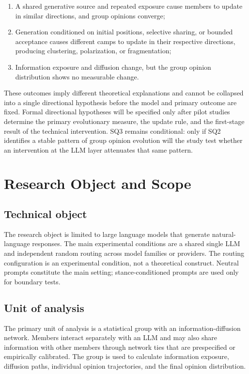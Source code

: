 \documentclass[11pt,a4paper]{article}
\begin{document}
\begin{enumerate}
\item A shared generative source and repeated exposure cause members to update in similar directions, and group opinions converge;
\item Generation conditioned on initial positions, selective sharing, or bounded acceptance causes different camps to update in their respective directions, producing clustering, polarization, or fragmentation;
\item Information exposure and diffusion change, but the group opinion distribution shows no measurable change.
\end{enumerate}

These outcomes imply different theoretical explanations and cannot be collapsed into a single directional hypothesis before the model and primary outcome are fixed. Formal directional hypotheses will be specified only after pilot studies determine the primary evolutionary measure, the update rule, and the first-stage result of the technical intervention. SQ3 remains conditional: only if SQ2 identifies a stable pattern of group opinion evolution will the study test whether an intervention at the LLM layer attenuates that same pattern.

\section{Research Object and Scope}

\subsection{Technical object}

The research object is limited to large language models that generate natural-language responses. The main experimental conditions are a shared single LLM and independent random routing across model families or providers. The routing configuration is an experimental condition, not a theoretical construct. Neutral prompts constitute the main setting; stance-conditioned prompts are used only for boundary tests.

\subsection{Unit of analysis}

The primary unit of analysis is a statistical group with an information-diffusion network. Members interact separately with an LLM and may also share information with other members through network ties that are prespecified or empirically calibrated. The group is used to calculate information exposure, diffusion paths, individual opinion trajectories, and the final opinion distribution.
\end{document}
